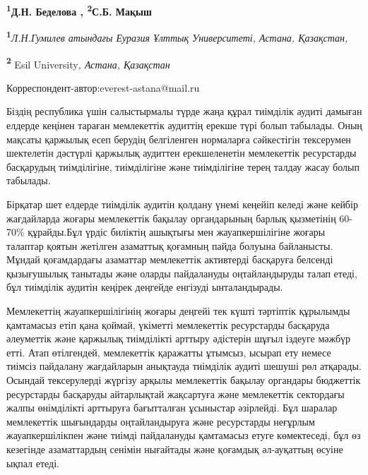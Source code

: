 
\begin{articleheader}

{\bfseries
\textsuperscript{1}Д.Н. Беделова\textsuperscript{\envelope } \authorid,
\textsuperscript{2}С.Б. Мақыш\authorid}
\end{articleheader}

\begin{affiliation}
{\bfseries \textsuperscript{1}}\emph{Л.Н.Гумилев атындағы Еуразия Ұлттық Университеті, Астана, Қазақстан,}

{\bfseries \textsuperscript{2}} Esil University\emph{, Астана, Қазақстан}

{\bfseries \textsuperscript{\envelope }}Корреспондент-автор:everest-astana@mail.ru
\end{affiliation}

Біздің республика үшін салыстырмалы түрде жаңа құрал тиімділік аудиті
дамыған елдерде кеңінен тараған мемлекеттік аудиттің ерекше түрі болып
табылады. Оның мақсаты қаржылық есеп берудің белгіленген нормаларға
сәйкестігін тексерумен шектелетін дәстүрлі қаржылық аудиттен
ерекшеленетін мемлекеттік ресурстарды басқарудың тиімділігіне,
тиімділігіне және тиімділігіне терең талдау жасау болып табылады.

Бірқатар шет елдерде тиімділік аудитін қолдану үнемі кеңейіп келеді және
кейбір жағдайларда жоғары мемлекеттік бақылау органдарының барлық
қызметінің 60-70\% құрайды.Бұл үрдіс биліктің ашықтығы мен
жауапкершілігіне жоғары талаптар қоятын жетілген азаматтық қоғамның
пайда болуына байланысты. Мұндай қоғамдардағы азаматтар мемлекеттік
активтерді басқаруға белсенді қызығушылық танытады және оларды
пайдалануды оңтайландыруды талап етеді, бұл тиімділік аудитін кеңірек
деңгейде енгізуді ынталандырады.

Мемлекеттің жауапкершілігінің жоғары деңгейі тек күшті тәртіптік
құрылымды қамтамасыз етіп қана қоймай, үкіметті мемлекеттік ресурстарды
басқаруда әлеуметтік және қаржылық тиімділікті арттыру әдістерін шұғыл
іздеуге мәжбүр етті. Атап өтілгендей, мемлекеттік қаражатты ұтымсыз,
ысырап ету немесе тиімсіз пайдалану жағдайларын анықтауда тиімділік
аудиті шешуші рөл атқарады. Осындай тексерулерді жүргізу арқылы
мемлекеттік бақылау органдары бюджеттік ресурстарды басқаруды
айтарлықтай жақсартуға және мемлекеттік сектордағы жалпы өнімділікті
арттыруға бағытталған ұсыныстар әзірлейді. Бұл шаралар мемлекеттік
шығындарды оңтайландыруға және ресурстарды неғұрлым жауапкершілікпен
және тиімді пайдалануды қамтамасыз етуге көмектеседі, бұл өз кезегінде
азаматтардың сенімін нығайтады және қоғамдық әл-ауқаттың өсуіне ықпал
етеді.

